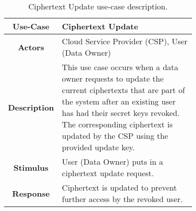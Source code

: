 \begin{table}[]
	\centering
	\begin{tabular}{|c|p{0.75\linewidth}|}
		\hline
		\textbf{Use-Case}    & Ciphertext Update                                  \\ \hline
		\textbf{Actors}      & Cloud Service Provider (CSP), User (Data Owner)                         \\ \hline
		\textbf{Description} & This use case occurs when a data owner requests to update the current ciphertexts that are part of the system after an existing user has had their secret keys revoked. The corresponding ciphertext is updated by the CSP using the provided update key. \\ \hline
		\textbf{Stimulus}    & User (Data Owner) puts in a ciphertext update request.                   \\ \hline
		\textbf{Response}    & Ciphertext is updated to prevent further access by the revoked user.             \\ \hline
	\end{tabular}
	\caption{Ciphertext Update use-case description.}
	\label{tab:use_case_ctupd}
\end{table}



